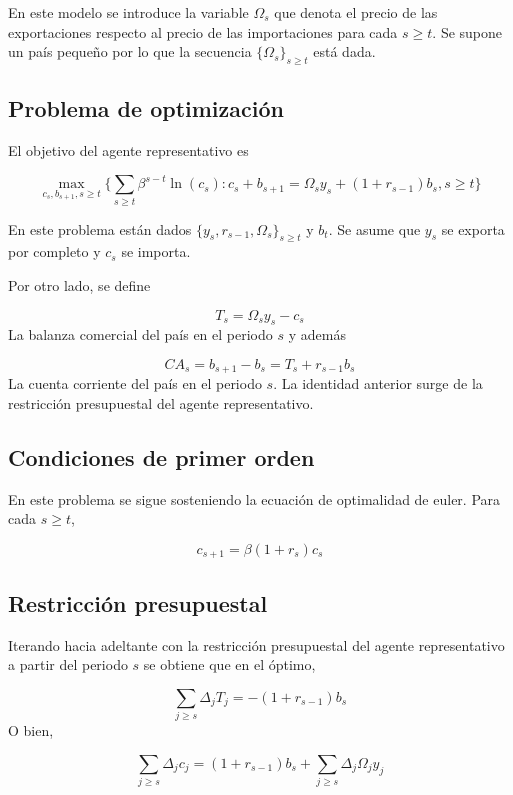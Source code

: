 \documentclass[]{article}
\begin{document}
En este modelo se introduce la variable \(\Omega_s\) que denota el
precio de las exportaciones respecto al precio de las importaciones para
cada \(s \geq t\). Se supone un país pequeño por lo que la secuencia
\(\{\Omega_s\}_{s \geq t}\) está dada.

\subsection{Problema de optimización}\label{problema-de-optimizacion-2}

El objetivo del agente representativo es

\[
\max_{c_s, b_{s+1}, s \geq t} \{ \sum_{s\geq t} \beta^{s-t}\ln(c_s):  c_s + b_{s+1} = \Omega_s y_s + (1+r_{s-1})b_s, s \geq t\}
\]

En este problema están dados \(\{y_s, r_{s-1}, \Omega_s\}_{s\geq t}\) y
\(b_t\). Se asume que \(y_s\) se exporta por completo y \(c_s\) se
importa.

Por otro lado, se define

\[
T_s = \Omega_s y_s- c_s
\] La balanza comercial del país en el periodo \(s\) y además

\[
CA_s = b_{s+1} - b_s = T_s + r_{s-1}b_s
\] La cuenta corriente del país en el periodo \(s\). La identidad
anterior surge de la restricción presupuestal del agente representativo.

\subsection{Condiciones de primer
orden}\label{condiciones-de-primer-orden-2}

En este problema se sigue sosteniendo la ecuación de optimalidad de
euler. Para cada \(s \geq t\),

\[
c_{s+1} = \beta(1 + r_{s})c_s
\]

\subsection{Restricción presupuestal}\label{restriccion-presupuestal-2}

Iterando hacia adeltante con la restricción presupuestal del agente
representativo a partir del periodo \(s\) se obtiene que en el óptimo,

\[
\sum_{j\geq s} \Delta_jT_j = -(1+r_{s-1})b_s 
\] O bien,

\[
\begin{equation}
\sum_{j\geq s} \Delta_jc_j = (1+r_{s-1})b_s  + \sum_{j\geq s} \Delta_j\Omega_j y_j
\end{equation}  
\]
\end{document}
